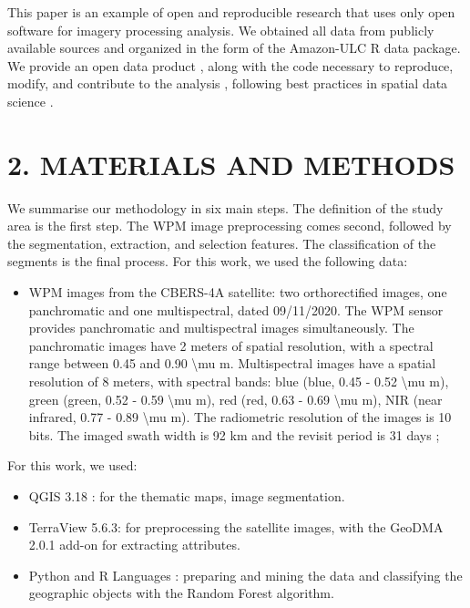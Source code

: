 \documentclass[preprint, 3p,
authoryear]{elsarticle} %
\providecommand{\tightlist}{%
  \setlength{\itemsep}{0pt}\setlength{\parskip}{0pt}}
\begin{document}
This paper is an example of open and reproducible research that uses
only open software for imagery processing analysis. We obtained all data
from publicly available sources and organized in the form of the
Amazon-ULC R data package. We provide an open data product
\citep{arribas2021open}, along with the code necessary to reproduce,
modify, and contribute to the analysis , following best practices in
spatial data science \citep{brunsdon2021opening, DESJARDINS2022103091}.

\hypertarget{materials-and-methods}{%
\section{2. MATERIALS AND METHODS}\label{materials-and-methods}}

We summarise our methodology in six main steps. The definition of the
study area is the first step. The WPM image preprocessing comes second,
followed by the segmentation, extraction, and selection features. The
classification of the segments is the final process. For this work, we
used the following data:

\begin{itemize}
\tightlist
\item
  WPM images from the CBERS-4A satellite: two orthorectified images, one
  panchromatic and one multispectral, dated 09/11/2020. The WPM sensor
  provides panchromatic and multispectral images simultaneously. The
  panchromatic images have 2 meters of spatial resolution, with a
  spectral range between 0.45 and 0.90 \textbackslash mu m.
  Multispectral images have a spatial resolution of 8 meters, with
  spectral bands: blue (blue, 0.45 - 0.52 \textbackslash mu m), green
  (green, 0.52 - 0.59 \textbackslash mu m), red (red, 0.63 - 0.69
  \textbackslash mu m), NIR (near infrared, 0.77 - 0.89
  \textbackslash mu m). The radiometric resolution of the images is 10
  bits. The imaged swath width is 92 km and the revisit period is 31
  days \citep{INPE2019};
\end{itemize}

For this work, we used:

\begin{itemize}
\item
  QGIS 3.18 \citep{QGISTeam2021}: for the thematic maps, image
  segmentation.
\item
  TerraView 5.6.3: for preprocessing the satellite images, with the
  GeoDMA 2.0.1 add-on \citep{Korting2013} for extracting attributes.
\item
  Python \citep{vanRossum1995} and R Languages \citep{R2022} : preparing
  and mining the data and classifying the geographic objects with the
  Random Forest algorithm.
\end{itemize}
\end{document}
